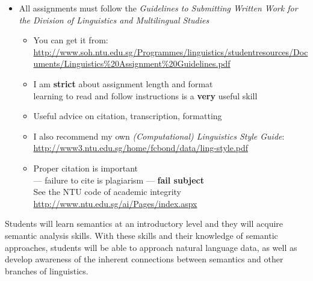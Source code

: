 \documentclass[headrule,footrule]{foils}
\begin{document}

\begin{itemize}
\item All assignments must follow the \textit{Guidelines to Submitting Written Work for the Division of Linguistics and Multilingual Studies}
  \begin{itemize}
  \item You can get it from:
\url{http://www.soh.ntu.edu.sg/Programmes/linguistics/studentresources/Documents/Linguistics%20Assignment%20Guidelines.pdf}
  \item I am \textbf{strict} about assignment length and format
    \\ learning to read and follow instructions is a \textbf{very} useful skill
  \item Useful advice on citation, transcription, formatting
  \item I also recommend my own \textit{(Computational) Linguistics Style Guide}:
 \url{http://www3.ntu.edu.sg/home/fcbond/data/ling-style.pdf}
  \item Proper citation is important 
    \\ --- failure to cite is plagiarism --- \textbf{fail subject}
 \\ See the NTU code of academic integrity 
 \\\url{http://www.ntu.edu.sg/ai/Pages/index.aspx}
  \end{itemize}
\end{itemize}






Students will learn semantics at an introductory level and they will
acquire semantic analysis skills. With these skills and their
knowledge of semantic approaches, students will be able to approach
natural language data, as well as develop awareness of the inherent
connections between semantics and other branches of linguistics.
\end{document}
